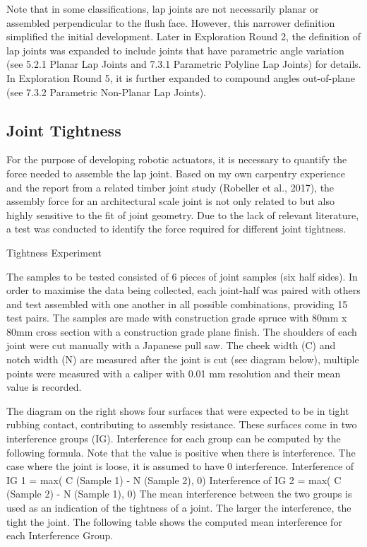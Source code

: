 Note that in some classifications, lap joints are not necessarily planar or assembled perpendicular to the flush face. However, this narrower definition simplified the initial development. Later in Exploration Round 2, the definition of lap joints was expanded to include joints that have parametric angle variation (see 5.2.1 Planar Lap Joints and 7.3.1 Parametric Polyline Lap Joints) for details. In Exploration Round 5, it is further expanded to compound angles out-of-plane (see 7.3.2 Parametric Non-Planar Lap Joints). 
\subsection{Joint Tightness}
For the purpose of developing robotic actuators, it is necessary to quantify the force needed to assemble the lap joint. Based on my own carpentry experience and the report from a related timber joint study (Robeller et al., 2017), the assembly force for an architectural scale joint is not only related to but also highly sensitive to the fit of joint geometry. 
Due to the lack of relevant literature, a test was conducted to identify the force required for different joint tightness.

Tightness Experiment

The samples to be tested consisted of 6 pieces of joint samples (six half sides). In order to maximise the data being collected, each joint-half was paired with others and test assembled with one another in all possible combinations, providing 15 test pairs.
The samples are made with construction grade spruce with 80mm x 80mm cross section with a construction grade plane finish. The shoulders of each joint were cut manually with a Japanese pull saw. The cheek width (C) and notch width (N) are measured after the joint is cut (see diagram below), multiple points were measured with a caliper with 0.01 mm resolution and their mean value is recorded.

The diagram on the right shows four surfaces that were expected to be in tight rubbing contact, contributing to assembly resistance. These surfaces come in two interference groups (IG). Interference for each group can be computed by the following formula. Note that the value is positive when there is interference. The case where the joint is loose, it is assumed to have 0 interference. 
Interference of IG 1 = max( C (Sample 1) - N (Sample 2), 0)
Interference of IG 2 = max( C (Sample 2) - N (Sample 1), 0)
The mean interference between the two groups is used as an indication of the tightness of a joint. The larger the interference, the tight the joint. The following table shows the computed mean interference for each Interference Group.

